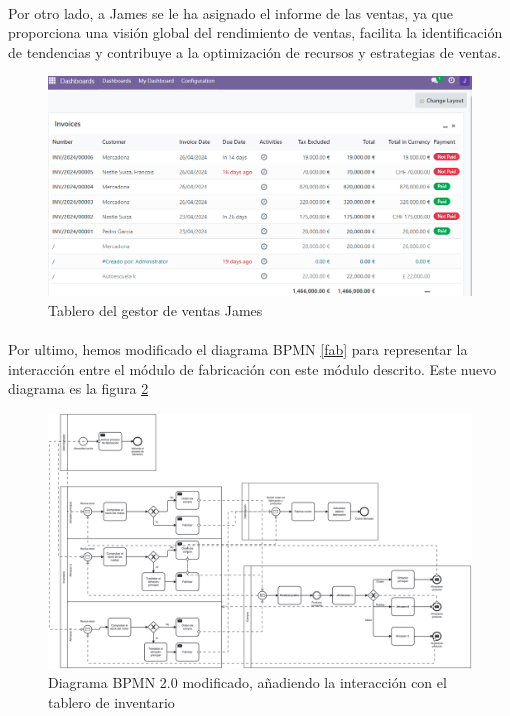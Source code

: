 \paragraph{}
Por otro lado, a James se le ha asignado el informe de las ventas, ya que proporciona una visión global del rendimiento de ventas, facilita la identificación de tendencias y contribuye a la optimización de recursos y estrategias de ventas.
\newpage
\begin{figure}[h]
    \centering
    \includegraphics[width=1\linewidth]{fotosDecisiones/james.png}
    \caption{Tablero del gestor de ventas James}
    \label{fig:enter-label}
\end{figure}
\paragraph{}
Por ultimo, hemos modificado el diagrama BPMN \ref{fab} para representar la interacción entre el módulo de fabricación con este módulo descrito. Este nuevo diagrama es la figura \ref{bi}

\begin{figure}[h]
    \centering
    \includegraphics[width=1\linewidth]{fotosGestFab/BI.png}
    \caption{Diagrama BPMN 2.0 modificado, añadiendo la interacción con el tablero de inventario}
    \label{bi}
\end{figure}
